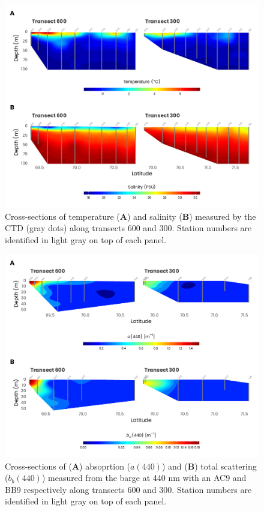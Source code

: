 \documentclass[essd, manuscript]{copernicus}
\begin{document}
\clearpage

\begin{figure}[H]
	\centering
	\includegraphics[scale = 1]{../../../graphs/fig04.pdf}
	\caption{Cross-sections of temperature (\textbf{A}) and salinity (\textbf{B}) measured by the CTD (gray dots) along transects 600 and 300. Station numbers are identified in light gray on top of each panel.}
\end{figure}

\clearpage

\begin{figure}[H]
	\centering
	\includegraphics[scale = 0.85]{../../../graphs/fig05.pdf}
	\caption{Cross-sections of (\textbf{A}) absoprtion ($a(440)$) and (\textbf{B}) total scattering ($b_b(440)$) measured from the barge at 440 nm with an AC9 and BB9 respectively along transects 600 and 300. Station numbers are identified in light gray on top of each panel.}
\end{figure}
\end{document}
